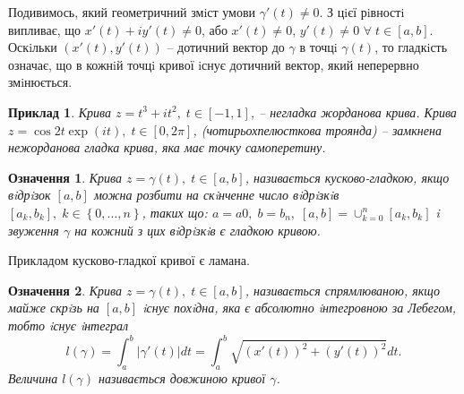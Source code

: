 \documentclass[10pt]{report} %
\let\oldforall\forall
\renewcommand{\forall}{\oldforall\;}
\newtheorem{definition}{Означення}[section]
\newtheorem{example}{\indent Приклад}[section]
\begin{document}
Подивимось, який геометричний змiст умови $\gamma' (t) \neq 0$. З цiєї рiвностi випливає, що
$x' (t) + iy' (t) \neq 0$, або $x' (t) \neq 0$, $y' (t)\neq 0$ $\forall t \in [a, b]$. Оскiльки $(x' (t), y' (t))$ -- дотичний
вектор до $\gamma$ в точцi $\gamma(t)$, то гладкiсть означає, що в кожнiй точцi кривої iснує дотичний
вектор, який неперервно змiнюється.
\begin{example}
Крива $z = t^3 + it^2,\;t \in [-1, 1]$, -- негладка жорданова крива. Крива $z = \cos 2t \exp(it),\;t \in [0, 2\pi]$, (чотирьохпелюсткова троянда)
 -- замкнена нежорданова гладка крива, яка має точку самоперетину.
\end{example}
\begin{definition}
Крива $z = \gamma(t),\;t\in [a, b]$, називається кусково-гладкою, якщо вiдрiзок
$[a, b]$ можна розбити на скiнченне число вiдрiзкiв $[a_k , b_k ],\;k\in \left\{0,\ldots, n\right\}$, таких що:
$a = a0,\;b = b_n,\;[a, b] = \cup_{k=0}^n [a_k , b_k ]$ i звуження $\gamma$ на кожний з цих вiдрiзкiв є гладкою кривою.
\end{definition}

Прикладом кусково-гладкої кривої є ламана.
\begin{definition}
Крива $z = \gamma(t),\;t\in [a, b]$, називається спрямлюваною, якщо майже скрiзь на $[a, b]$ iснує похiдна, яка є абсолютно iнтегровною за Лебегом,
 тобто iснує iнтеграл
\[l(\gamma)=\int_a^b|\gamma'(t)|dt=\int_a^b\sqrt{{(x'(t))}^2+{(y'(t))}^2}dt.\]
Величина $l(\gamma)$ називається довжиною кривої $\gamma$.
\end{definition}
\end{document}
